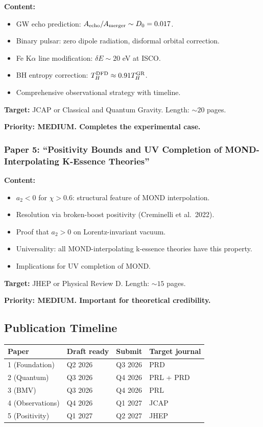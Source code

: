 \documentclass[11pt,a4paper]{article}
\begin{document}
\textbf{Content:}
\begin{itemize}
\item GW echo prediction: $A_{\rm echo}/A_{\rm merger} \sim D_0 = 0.017$.
\item Binary pulsar: zero dipole radiation, disformal orbital correction.
\item Fe K$\alpha$ line modification: $\delta E \sim 20$ eV at ISCO.
\item BH entropy correction: $T_H^{\rm DFD} \approx 0.91 T_H^{\rm GR}$.
\item Comprehensive observational strategy with timeline.
\end{itemize}

\textbf{Target:} JCAP or Classical and Quantum Gravity. Length: $\sim 20$ pages.

\textbf{Priority: MEDIUM. Completes the experimental case.}

\subsubsection{Paper 5: ``Positivity Bounds and UV Completion of MOND-Interpolating K-Essence Theories''}

\textbf{Content:}
\begin{itemize}
\item $a_2 < 0$ for $\chi > 0.6$: structural feature of MOND interpolation.
\item Resolution via broken-boost positivity (Creminelli et al.\ 2022).
\item Proof that $a_2 > 0$ on Lorentz-invariant vacuum.
\item Universality: all MOND-interpolating k-essence theories have this property.
\item Implications for UV completion of MOND.
\end{itemize}

\textbf{Target:} JHEP or Physical Review D. Length: $\sim 15$ pages.

\textbf{Priority: MEDIUM. Important for theoretical credibility.}

\subsection{Publication Timeline}

\begin{center}
\begin{tabular}{llll}
\toprule
\textbf{Paper} & \textbf{Draft ready} & \textbf{Submit} & \textbf{Target journal} \\
\midrule
1 (Foundation) & Q2 2026 & Q3 2026 & PRD \\
2 (Quantum) & Q3 2026 & Q4 2026 & PRL + PRD \\
3 (BMV) & Q3 2026 & Q4 2026 & PRL \\
4 (Observations) & Q4 2026 & Q1 2027 & JCAP \\
5 (Positivity) & Q1 2027 & Q2 2027 & JHEP \\
\bottomrule
\end{tabular}
\end{center}
\end{document}
